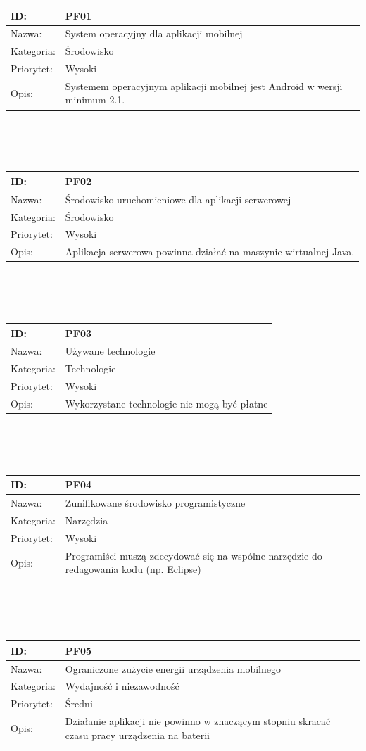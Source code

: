 \documentclass[11pt,a4paper,polish,thesis]{dcsbook}
\begin{document}
\begin{tabular}{|p{2cm}|p{12cm}|}  \hline ID: &
PF01
\\ \hline Nazwa: &
System operacyjny dla aplikacji mobilnej	
\\ \hline Kategoria: &
Środowisko
\\ \hline Priorytet: &
Wysoki
\\ \hline Opis: &
Systemem operacyjnym aplikacji mobilnej jest Android w wersji minimum 2.1.

\\ \hline \end{tabular} \\\\\ \begin{tabular}{|p{2cm}|p{12cm}|}  \hline ID: &
PF02
\\ \hline Nazwa: &
Środowisko uruchomieniowe dla aplikacji serwerowej
\\ \hline Kategoria: &
Środowisko
\\ \hline Priorytet: &
Wysoki
\\ \hline Opis: &
Aplikacja serwerowa powinna działać na maszynie wirtualnej Java.

\\ \hline \end{tabular} \\\\\ \begin{tabular}{|p{2cm}|p{12cm}|}  \hline ID: &
PF03
\\ \hline Nazwa: &
Używane technologie
\\ \hline Kategoria: &
Technologie
\\ \hline Priorytet: &
Wysoki
\\ \hline Opis: &
Wykorzystane technologie nie mogą być płatne

\\ \hline \end{tabular} \\\\\ \begin{tabular}{|p{2cm}|p{12cm}|}  \hline ID: &
PF04
\\ \hline Nazwa: &
Zunifikowane środowisko programistyczne
\\ \hline Kategoria: &
Narzędzia
\\ \hline Priorytet: &
Wysoki
\\ \hline Opis: &
Programiści muszą zdecydować się na wspólne narzędzie do redagowania kodu (np. Eclipse)

\\ \hline \end{tabular} \\\\\ \begin{tabular}{|p{2cm}|p{12cm}|}  \hline ID: &
PF05
\\ \hline Nazwa: &
Ograniczone zużycie energii urządzenia mobilnego
\\ \hline Kategoria: &
Wydajność i niezawodność
\\ \hline Priorytet: &
Średni
\\ \hline Opis: &
Działanie aplikacji nie powinno w znaczącym stopniu skracać czasu pracy urządzenia na baterii


\end{tabular}
\end{document}
